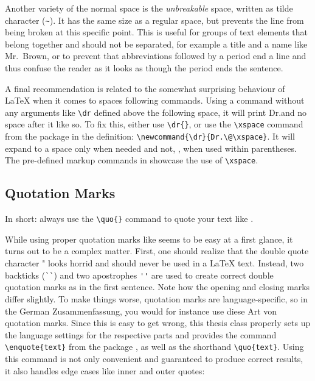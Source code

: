 Another variety of the normal space is the \emph{unbreakable} space, written
as tilde character (\verb!~!). It has the same size as a regular space, but
prevents the line from being broken at this specific point. This is useful for
groups of text elements that belong together and should not be separated, for
example a title and a name like Mr.~Brown, or to prevent that abbreviations
followed by a period end a line and thus confuse the reader as it looks as
though the period ends the sentence.

A final recommendation is related to the somewhat surprising behaviour of
\LaTeX{} when it comes to spaces following commands. Using a command without
any arguments like \verb!\dr! defined above  the following
space, \ie it will print Dr.and no space after it like so. To fix this, either
use \verb!\dr{}!, or use the \verb!\xspace! command from the 
package in the definition: \verb!\newcommand{\dr}{Dr.\@\xspace}!. It will
expand to a space only when needed and not, \eg, when used within parentheses.
The pre-defined markup commands in  showcase the
use of \verb!\xspace!.

\subsection{Quotation Marks}

In short: always use the \verb!\quo{}! command to quote your text like
.

While using proper quotation marks like  seems to be easy at a
first glance, it turns out to be a complex matter. First, one should realize
that the double quote character " looks horrid and should never be used in a
\LaTeX{} text. Instead, two backticks (\verb!``!) and two apostrophes
\verb!''! are used to create correct double quotation marks as in the first
sentence. Note how the opening and closing marks differ slightly. To make
things worse, quotation marks are language-specific, so in the German
Zusammenfassung, you would for instance use \glqq{}diese Art von\grqq{}
quotation marks.  Since this is easy to get wrong, this thesis class properly
sets up the language settings for the respective parts and provides the
command \verb!\enquote{text}! from the package , as well as the
shorthand \verb!\quo{text}!. Using this command is not only convenient and
guaranteed to produce correct results, it also handles edge cases like inner
and outer quotes: 

